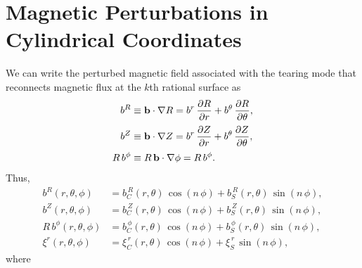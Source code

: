 \documentclass[12pt,prb,aps,notitlepage]{revtex4-1}
\begin{document}
\section{Magnetic Perturbations in Cylindrical Coordinates}
We can write the perturbed magnetic field associated with the tearing mode that reconnects magnetic flux at the $k$th rational surface as
\begin{align}
b^R &\equiv {\bf b}\cdot\nabla R = b^r\,\frac{\partial R}{\partial r}+ b^\theta\,\frac{\partial R}{\partial\theta},\\[0.5ex]
b^Z &\equiv {\bf b}\cdot\nabla Z = b^r\,\frac{\partial Z}{\partial r}+ b^\theta\,\frac{\partial Z}{\partial\theta},\\[0.5ex]
R\,b^\phi&\equiv R\,{\bf b}\cdot\nabla\phi = R\,b^\phi.
\end{align}
Thus,
\begin{align}
b^R(r,\theta,\phi) &= b^{\,R}_C(r,\theta)\,\cos(n\,\phi) + b_S^{\,R}(r,\theta)\,\sin(n\,\phi),\\[0.5ex]
b^Z(r,\theta,\phi) &= b^{\,Z}_C(r,\theta)\,\cos(n\,\phi) + b_S^{\,Z}(r,\theta)\,\sin(n\,\phi),\\[0.5ex]
R\,b^\phi(r,\theta,\phi) &= b^{\,\phi}_C(r,\theta)\,\cos(n\,\phi) + b_S^{\,\phi}(r,\theta)\,\sin(n\,\phi),\\[0.5ex]\xi^r(r,\theta,\phi)&= \xi^{\,r}_{C}(r,\theta)\,\cos(n\,\phi) + \xi^{\,r}_{S}\,\sin(n\,\phi),
\end{align}
where
\end{document}
